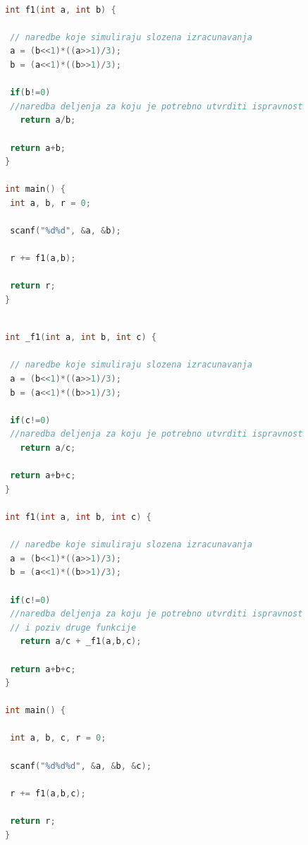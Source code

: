 \documentclass[12pt,oneside]{memoir}
\begin{document}
\begin{lstlisting}[basicstyle=\fontsize{4}{4}\selectfont,language=C,frame=single,caption=Пример програма прве категорије (друга верзија),label=primer_nivo_1t]

int f1(int a, int b) {

 // naredbe koje simuliraju slozena izracunavanja
 a = (b<<1)*((a>>1)/3);
 b = (a<<1)*((b>>1)/3);
 
 if(b!=0)
 //naredba deljenja za koju je potrebno utvrditi ispravnost
   return a/b;
 
 return a+b;
}

int main() {
 int a, b, r = 0;
 
 scanf("%d%d", &a, &b);
 
 r += f1(a,b);

 return r;
}

\end{lstlisting}

\begin{lstlisting}[basicstyle=\fontsize{4}{4}\selectfont,language=C,frame=single,caption=Пример програма друге категорије (прва верзија),label=primer_nivo_2]

int _f1(int a, int b, int c) {

 // naredbe koje simuliraju slozena izracunavanja
 a = (b<<1)*((a>>1)/3);
 b = (a<<1)*((b>>1)/3);

 if(c!=0)
 //naredba deljenja za koju je potrebno utvrditi ispravnost
   return a/c;

 return a+b+c;
}

int f1(int a, int b, int c) {

 // naredbe koje simuliraju slozena izracunavanja
 a = (b<<1)*((a>>1)/3);
 b = (a<<1)*((b>>1)/3);

 if(c!=0)
 //naredba deljenja za koju je potrebno utvrditi ispravnost
 // i poziv druge funkcije 
   return a/c + _f1(a,b,c);

 return a+b+c;
}

int main() {

 int a, b, c, r = 0;

 scanf("%d%d%d", &a, &b, &c);

 r += f1(a,b,c);

 return r;
}


\end{lstlisting}
\end{document}
